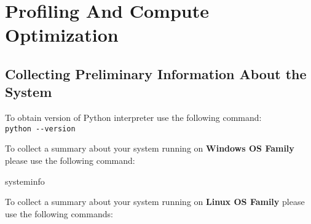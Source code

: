 \documentclass[
]{article}
\newenvironment{Shaded}{}{}
\newcommand{\AttributeTok}[1]{\textcolor[rgb]{0.49,0.56,0.16}{#1}}
\newcommand{\BuiltInTok}[1]{#1}
\newcommand{\CommentTok}[1]{\textcolor[rgb]{0.38,0.63,0.69}{\textit{#1}}}
\newcommand{\ExtensionTok}[1]{#1}
\newcommand{\FunctionTok}[1]{\textcolor[rgb]{0.02,0.16,0.49}{#1}}
\newcommand{\NormalTok}[1]{#1}
\newcommand{\StringTok}[1]{\textcolor[rgb]{0.25,0.44,0.63}{#1}}
\newcommand{\VariableTok}[1]{\textcolor[rgb]{0.10,0.09,0.49}{#1}}
\begin{document}
\hypertarget{profiling-and-compute-optimization}{%
\section{Profiling And Compute
Optimization}\label{profiling-and-compute-optimization}}

\hypertarget{collecting-preliminary-information-about-the-system}{%
\subsection{Collecting Preliminary Information About the
System}\label{collecting-preliminary-information-about-the-system}}

To obtain version of Python interpreter use the following command:\\
\texttt{python\ -\/-version}

To collect a summary about your system running on \textbf{Windows OS
Family} please use the following command:

\begin{Shaded}
\begin{Highlighting}[]
\ExtensionTok{systeminfo}
\end{Highlighting}
\end{Shaded}

To collect a summary about your system running on \textbf{Linux OS
Family} please use the following commands:

\begin{Shaded}
\end{Shaded}
\end{document}
